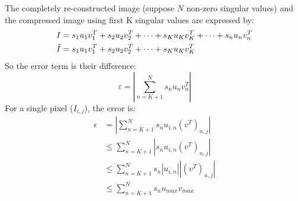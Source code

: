 \begin{questions}
\begin{parts}
\begin{solution}
    The completely re-constructed image (suppose $N$ non-zero singular values) and the compressed image using first K singular values are expressed by:
    \begin{equation}
        \begin{split}
            I 
            &= s _ { 1 } u _ { 1 } v _ { 1 } ^ { T } + s _ { 2 } u _ { 2 } v _ { 2 } ^ { T } + \cdots + s _ { K } u _ { K } v _ { K } ^ { T } + \cdots + s _ { n } u _ { n } v _ { n } ^ { T } \\
        \Tilde{I} 
        &= s _ { 1 } u _ { 1 } v _ { 1 } ^ { T } + s _ { 2 } u _ { 2 } v _ { 2 } ^ { T } + \cdots + s _ { K } u _ { K } v _ { K } ^ { T }
        \end{split}
    \end{equation}
    So the error term is their difference:
    \begin{equation}
        \varepsilon = |\sum_{n=K+1}^{N} s _ { n } u _ { n } v _ { n } ^ { T } |
    \end{equation}
    For a single pixel ($I_{i,j}$), the error is:
    \begin{equation}
        \begin{split}
        \epsilon 
        &= | \sum_{n=K+1}^{N} s _ { n } u _ { i, n } (v ^ { T })_{n, j} |\\
        &\leqslant \sum_{n=K+1}^{N} |s _ { n } u _ { i, n } (v ^ { T })_{n, j}|\\
        &\leqslant \sum_{n=K+1}^{N} s _ { n } |u _ { i, n }| |(v ^ { T })_{n, j}|\\
        &\leqslant \sum_{n=K+1}^{N} s _ { n } u _ { max } v _{max}\\
    \end{split}
    \end{equation}
    
\end{solution}


\end{parts}
\end{questions}
